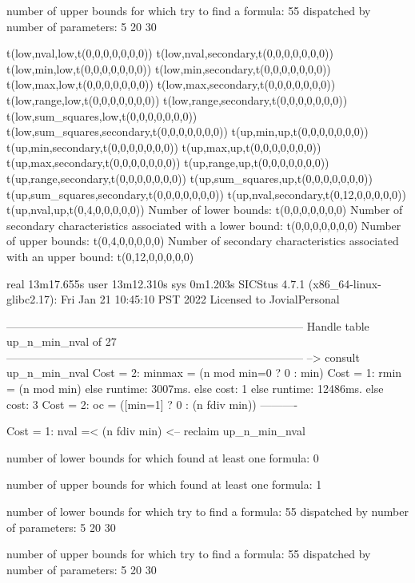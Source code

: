 number of upper bounds for which try to find a formula: 55
dispatched by number of parameters: 5  20  30

t(low,nval,low,t(0,0,0,0,0,0,0))
t(low,nval,secondary,t(0,0,0,0,0,0,0))
t(low,min,low,t(0,0,0,0,0,0,0))
t(low,min,secondary,t(0,0,0,0,0,0,0))
t(low,max,low,t(0,0,0,0,0,0,0))
t(low,max,secondary,t(0,0,0,0,0,0,0))
t(low,range,low,t(0,0,0,0,0,0,0))
t(low,range,secondary,t(0,0,0,0,0,0,0))
t(low,sum_squares,low,t(0,0,0,0,0,0,0))
t(low,sum_squares,secondary,t(0,0,0,0,0,0,0))
t(up,min,up,t(0,0,0,0,0,0,0))
t(up,min,secondary,t(0,0,0,0,0,0,0))
t(up,max,up,t(0,0,0,0,0,0,0))
t(up,max,secondary,t(0,0,0,0,0,0,0))
t(up,range,up,t(0,0,0,0,0,0,0))
t(up,range,secondary,t(0,0,0,0,0,0,0))
t(up,sum_squares,up,t(0,0,0,0,0,0,0))
t(up,sum_squares,secondary,t(0,0,0,0,0,0,0))
t(up,nval,secondary,t(0,12,0,0,0,0,0))
t(up,nval,up,t(0,4,0,0,0,0,0))
Number of lower bounds:                                             t(0,0,0,0,0,0,0)
Number of secondary characteristics associated with a lower bound:  t(0,0,0,0,0,0,0)
Number of upper bounds:                                             t(0,4,0,0,0,0,0)
Number of secondary characteristics associated with an upper bound: t(0,12,0,0,0,0,0)

real	13m17.655s
user	13m12.310s
sys	0m1.203s
SICStus 4.7.1 (x86_64-linux-glibc2.17): Fri Jan 21 10:45:10 PST 2022
Licensed to JovialPersonal


--------------------------------------------------------------------------------
Handle table up_n_min_nval of 27
--------------------------------------------------------------------------------
--> consult up_n_min_nval
Cost =  2:  minmax = (n mod min=0 ? 0 : min)
Cost =  1:  rmin   = (n mod min)
else runtime: 3007ms. else cost: 1
else runtime: 12486ms. else cost: 3
Cost =  2:  oc     = ([min=1] ? 0 : (n fdiv min)) %
----------

Cost =  1:  nval =< (n fdiv min)
<-- reclaim up_n_min_nval

number of lower bounds for which found at least one formula: 0

number of upper bounds for which found at least one formula: 1

number of lower bounds for which try to find a formula: 55
dispatched by number of parameters: 5  20  30

number of upper bounds for which try to find a formula: 55
dispatched by number of parameters: 5  20  30

